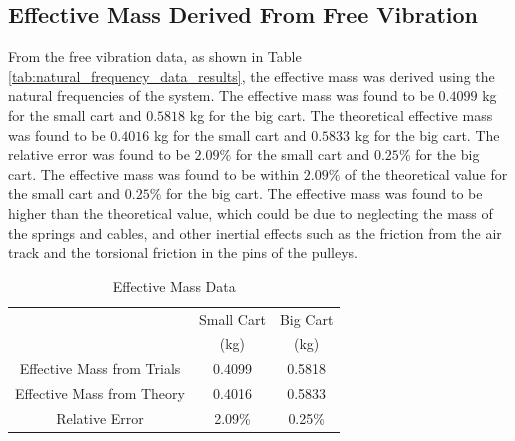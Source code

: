 \subsection{Effective Mass Derived From Free Vibration}
From the free vibration data, as shown in Table \ref{tab:natural_frequency_data_results}, the effective mass was derived using the natural frequencies of the system. The effective mass was found to be $0.4099$ kg for the small cart and $0.5818$ kg for the big cart. The theoretical effective mass was found to be $0.4016$ kg for the small cart and $0.5833$ kg for the big cart. The relative error was found to be $2.09\%$ for the small cart and $0.25\%$ for the big cart. The effective mass was found to be within $2.09\%$ of the theoretical value for the small cart and $0.25\%$ for the big cart. The effective mass was found to be higher than the theoretical value, which could be due to neglecting the mass of the springs and cables, and other inertial effects such as the friction from the air track and the torsional friction in the pins of the pulleys.
\begin{table}[H]
    \centering
    \caption{Effective Mass Data}
    \label{tab:effective_mass_data_for_effective_mass_results}
    \begin{tabular}{ccc}
    \toprule
        & Small Cart & Big Cart \\
        & (kg) & (kg) \\
        \midrule
        Effective Mass from Trials & 0.4099 & 0.5818 \\
        Effective Mass from Theory & 0.4016 & 0.5833 \\
        \midrule 
        Relative Error & 2.09\% & 0.25\% \\
        \bottomrule
    \end{tabular}
\end{table}